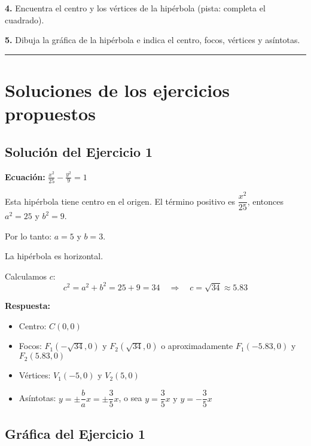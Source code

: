 \documentclass[12pt,a4paper]{article}
\begin{document}
	\bigskip

	\textbf{4.} Encuentra el centro y los vértices de la hipérbola {\color{red}{$4y^2-9x^2-8y+36x-68=0$}} (pista: completa el cuadrado).

	\bigskip

	\textbf{5.} Dibuja la gráfica de la hipérbola {} e indica el centro, focos, vértices y asíntotas.

	\bigskip
	\bigskip

	\hrule

	\bigskip
	\bigskip

	\section{Soluciones de los ejercicios propuestos}

	\subsection*{Solución del Ejercicio 1}

	\textbf{Ecuación:} $\displaystyle\frac{x^2}{25}-\frac{y^2}{9}=1$

	\bigskip

	Esta hipérbola tiene centro en el origen. El término positivo es $\dfrac{x^2}{25}$, entonces $a^2=25$ y $b^2=9$.

	\bigskip

	Por lo tanto: $a=5$ y $b=3$.

	\bigskip

	La hipérbola es horizontal.

	\bigskip

	Calculamos $c$:
	\[
	c^2=a^2+b^2=25+9=34 \quad\Rightarrow\quad c=\sqrt{34}\approx 5.83
	\]

	\textbf{Respuesta:}
	\begin{itemize}
		\item Centro: $\boxed{C(0,0)}$
		\item Focos: $\boxed{F_1(-\sqrt{34},0)\text{ y }F_2(\sqrt{34},0)}$ o aproximadamente $F_1(-5.83,0)$ y $F_2(5.83,0)$
		\item Vértices: $\boxed{V_1(-5,0)\text{ y }V_2(5,0)}$
		\item Asíntotas: $y=\pm\dfrac{b}{a}x=\pm\dfrac{3}{5}x$, o sea $\boxed{y=\dfrac{3}{5}x\text{ y }y=-\dfrac{3}{5}x}$
	\end{itemize}

	\subsection*{Gráfica del Ejercicio 1}
\end{document}
